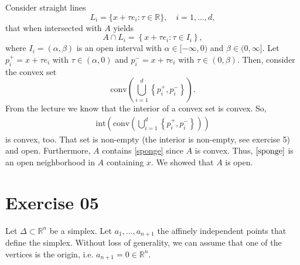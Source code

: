 \documentclass{article}
\begin{document}
\begin{enumerate}
    Consider straight lines 
    $$
        L_i = \{ x  + \tau e_i : \tau \in \mathbb{R} \}, \quad i = 1,..., d,
    $$
    that when intersected with $A$ yields 
    $$
        A \cap L_i = \left\{ x + \tau e_i : \tau \in I_i \right\},
    $$
    where $I_i = (\alpha,\beta)$ is an open interval with $\alpha \in [-\infty, 0)$ and $\beta \in (0, \infty]$. Let $p_i^+ = x + \tau e_i$ with $\tau \in (\alpha,0)$ and $p_i^- = x + \tau e_i$ with $\tau \in (0, \beta)$. Then, consider the convex set 
    $$
        \mathrm{conv}\left(
            \bigcup_{i=1}^d \left\{ p_i^+, p_i^- \right\}
        \right).
    $$
    From the lecture we know that the interior of a convex set is convex. So, 
    \begin{align}\label{sponge}
        \mathrm{int}\left( \mathrm{conv}\left(
        \bigcup_{i=1}^d \left\{ p_i^+, p_i^- \right\}
    \right)\right)
    \end{align}
    is convex, too. That set is non-empty (the interior is non-empty, see exercise 5) and open. Furthermore, $A$ contains \eqref{sponge} since $A$ is convex. Thus, $\eqref{sponge}$ is an open neighborhood in $A$ containing $x$. We showed that $A$ is open.

\end{enumerate}

\section*{Exercise 05}
Let $\Delta \subset\mathbb R^n$ be a simplex. Let $a_1,...,a_{n+1}$ the affinely independent points that define the simplex. Without loss of generality, we can assume that one of the vertices is the origin, i.e. $a_{n+1} = 0 \in \mathbb R^n$. 
\end{document}
